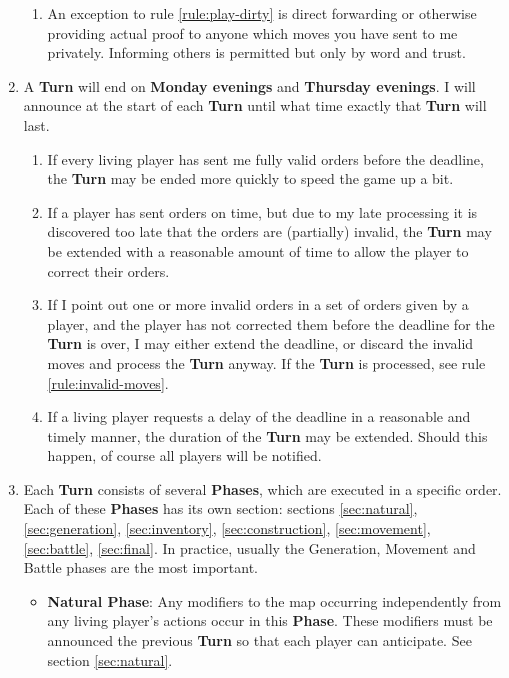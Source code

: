 \documentclass[10pt,openright,a4paper,openany]{article}
\newcommand{\term}[1]{\textbf{\color{purple} #1}}
\begin{document}
\begin{enumerate}
	\begin{enumerate}
		\item An exception to rule \ref{rule:play-dirty} is direct forwarding or otherwise providing actual proof to anyone which moves you have sent to me privately. Informing others is permitted but only by word and trust.
	\end{enumerate}
	\item A \term{Turn} will end on \textbf{Monday evenings} and \textbf{Thursday evenings}. I will announce at the start of each \term{Turn} until what time exactly that \term{Turn} will last.
	\begin{enumerate}
		\item If every living player has sent me fully valid orders before the deadline, the \term{Turn} may be ended more quickly to speed the game up a bit.
		\item If a player has sent orders on time, but due to my late processing it is discovered too late that the orders are (partially) invalid, the \term{Turn} may be extended with a reasonable amount of time to allow the player to correct their orders.
		\item If I point out one or more invalid orders in a set of orders given by a player, and the player has not corrected them before the deadline for the \term{Turn} is over, I may either extend the deadline, or discard the invalid moves and process the \term{Turn} anyway. If the \term{Turn} is processed, see rule \ref{rule:invalid-moves}.
		\item If a living player requests a delay of the deadline in a reasonable and timely manner, the duration of the \term{Turn} may be extended. Should this happen, of course all players will be notified.
	\end{enumerate}
	\item Each \term{Turn} consists of several \term{Phases}, which are executed in a specific order. Each of these \term{Phases} has its own section: sections \ref{sec:natural}, \ref{sec:generation}, \ref{sec:inventory}, \ref{sec:construction}, \ref{sec:movement}, \ref{sec:battle}, \ref{sec:final}. In practice, usually the Generation, Movement and Battle phases are the most important.
	\begin{itemize}
		\item \term{Natural Phase}: Any modifiers to the map occurring independently from any living player's actions occur in this \term{Phase}. These modifiers must be announced the previous \term{Turn} so that each player can anticipate. See section \ref{sec:natural}.

\end{itemize}
\end{enumerate}
\end{document}

